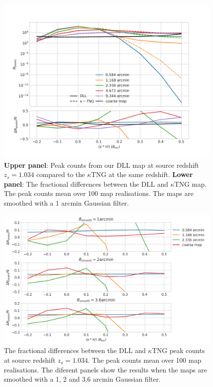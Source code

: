 \documentclass[twocolumn,twocolappendix]{aastex63}
\begin{document}
\begin{figure}
    \centering
    \includegraphics[width=\columnwidth]{paper/figures/peakktng_comp1arc.png}
    \caption{
      \textbf{Upper panel}: Peak counts from our DLL map at source redshift $z_s=1.034$ compared to the $\kappa$TNG at the same redshift. \textbf{Lower panel}: The fractional differences between the DLL and $\kappa$TNG map.
 The peak counts mean over 100 map realisations. The maps are smoothed with a 1 arcmin Gaussian filter. }
    \label{fig:peakktng_comp1arc}
\end{figure}


\begin{figure}
    \centering
    \includegraphics[width=\columnwidth]{paper/figures/peakktng_compallarc.png}
    \caption{
      The fractional differences between the DLL and $\kappa$TNG peak counts at source redshift $z_s=1.034$.
 The peak counts mean over 100 map realisations. The diferent panels show the results when the maps are smoothed with a 1, 2 and 3.6 arcmin Gaussian filter. }
    \label{fig:peakktng_compallarc}
\end{figure}
\end{document}
